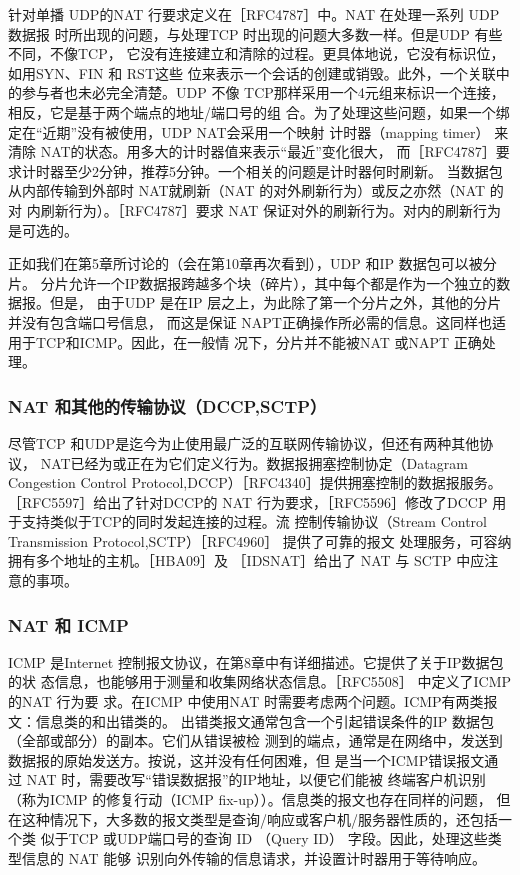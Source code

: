 针对单播 UDP的NAT 行要求定义在［RFC4787］中。NAT 在处理一系列 UDP 数据报
时所出现的问题，与处理TCP 时出现的问题大多数一样。但是UDP 有些不同，不像TCP，
它没有连接建立和清除的过程。更具体地说，它没有标识位，如用SYN、FIN 和 RST这些
位来表示一个会话的创建或销毁。此外，一个关联中的参与者也未必完全清楚。UDP 不像
TCP那样采用一个4元组来标识一个连接，相反，它是基于两个端点的地址/端口号的组
合。为了处理这些问题，如果一个绑定在“近期”没有被使用，UDP NAT会采用一个映射
计时器（mapping timer） 来清除 NAT的状态。用多大的计时器值来表示“最近”变化很大，
而［RFC4787］要求计时器至少2分钟，推荐5分钟。一个相关的问题是计时器何时刷新。
当数据包从内部传输到外部时 NAT就刷新（NAT 的对外刷新行为）或反之亦然（NAT 的对
内刷新行为）。［RFC4787］要求 NAT 保证对外的刷新行为。对内的刷新行为是可选的。

正如我们在第5章所讨论的（会在第10章再次看到），UDP 和IP 数据包可以被分片。
分片允许一个IP数据报跨越多个块（碎片），其中每个都是作为一个独立的数据报。但是，
由于UDP 是在IP 层之上，为此除了第一个分片之外，其他的分片并没有包含端口号信息，
而这是保证 NAPT正确操作所必需的信息。这同样也适用于TCP和ICMP。因此，在一般情
况下，分片并不能被NAT 或NAPT 正确处理。

\subsubsection{NAT 和其他的传输协议（DCCP,SCTP）}

尽管TCP 和UDP是迄今为止使用最广泛的互联网传输协议，但还有两种其他协议，
NAT已经为或正在为它们定义行为。数据报拥塞控制协定（Datagram Congestion Control
Protocol,DCCP）［RFC4340］提供拥塞控制的数据报服务。［RFC5597］给出了针对DCCP的
NAT 行为要求，［RFC5596］修改了DCCP 用于支持类似于TCP的同时发起连接的过程。流
控制传输协议（Stream Control Transmission Protocol,SCTP）［RFC4960］ 提供了可靠的报文
处理服务，可容纳拥有多个地址的主机。［HBA09］及 ［IDSNAT］给出了 NAT 与 SCTP 中应注
意的事项。

\subsubsection{NAT 和 ICMP}

ICMP 是Internet 控制报文协议，在第8章中有详细描述。它提供了关于IP数据包的状
态信息，也能够用于测量和收集网络状态信息。［RFC5508］ 中定义了ICMP 的NAT 行为要
求。在ICMP 中使用NAT 时需要考虑两个问题。ICMP有两类报文：信息类的和出错类的。
出错类报文通常包含一个引起错误条件的IP 数据包（全部或部分）的副本。它们从错误被检
测到的端点，通常是在网络中，发送到数据报的原始发送方。按说，这并没有任何困难，但
是当一个ICMP错误报文通过 NAT 时，需要改写“错误数据报”的IP地址，以便它们能被
终端客户机识别（称为ICMP 的修复行动（ICMP fix-up））。信息类的报文也存在同样的问题，
但在这种情况下，大多数的报文类型是查询/响应或客户机/服务器性质的，还包括一个类
似于TCP 或UDP端口号的查询 ID （Query ID） 字段。因此，处理这些类型信息的 NAT 能够
识别向外传输的信息请求，并设置计时器用于等待响应。

